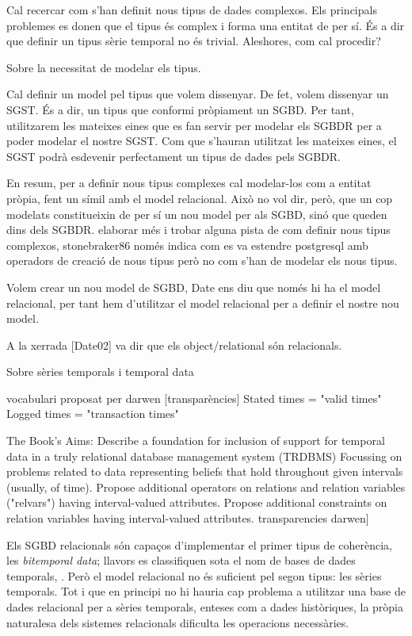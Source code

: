 Cal recercar com s'han definit nous tipus de dades complexos. Els principals problemes es donen que el tipus és complex i forma una entitat de per sí. És a dir que definir un tipus sèrie temporal no és trivial. Aleshores, com cal procedir?



Sobre la necessitat de modelar els tipus.

Cal definir un model pel tipus que volem dissenyar.
De fet, volem dissenyar un SGST. És a dir, un tipus que conformi pròpiament un SGBD. Per tant, utilitzarem les mateixes eines que es fan servir per modelar els SGBDR per a poder modelar el nostre SGST. Com que s'hauran utilitzat les mateixes eines, el SGST podrà esdevenir perfectament un tipus de dades pels SGBDR.

En resum, per a definir nous tipus complexes cal modelar-los com a entitat pròpia, fent un símil amb el model relacional. Això no vol dir, però, que un cop modelats constitueixin de per sí un nou model per als SGBD, sinó que queden dins dels SGBDR.  elaborar més i trobar alguna pista de com definir nous tipus complexos, stonebraker86 només indica com es va estendre postgresql amb operadors de creació de nous tipus però no com s'han de modelar els nous tipus.

Volem crear un nou model de SGBD, Date ens diu que només hi ha el model relacional, per tant hem d'utilitzar el model relacional per a definir el nostre nou model.


A la xerrada [Date02] va dir que els object/relational són relacionals.


Sobre sèries temporals i temporal data\cite{assfalg08:thesis}

vocabulari proposat per darwen [transparències]
Stated times = "valid times"
Logged times = "transaction times"


The Book’s Aims:
Describe a foundation for inclusion of support for temporal data in a truly
relational database management system (TRDBMS)
Focussing on problems related to data representing beliefs that hold throughout
given intervals (usually, of time).
Propose additional operators on relations and relation variables ("relvars")
having interval-valued attributes.
Propose additional constraints on relation variables having interval-valued
attributes.
transparencies darwen]


Els SGBD relacionals són capaços d'implementar el primer tipus de coherència, les \emph{bitemporal data}; llavors es classifiquen sota el nom de bases de dades temporals, \cite{date:introduction,wiki:temporal_database}. Però el model relacional no és suficient pel segon tipus: les sèries temporals. Tot i que en principi no hi hauria cap problema a utilitzar una base de dades relacional per a sèries temporals, enteses com a dades històriques, la pròpia naturalesa dels sistemes relacionals  dificulta les operacions necessàries. 


